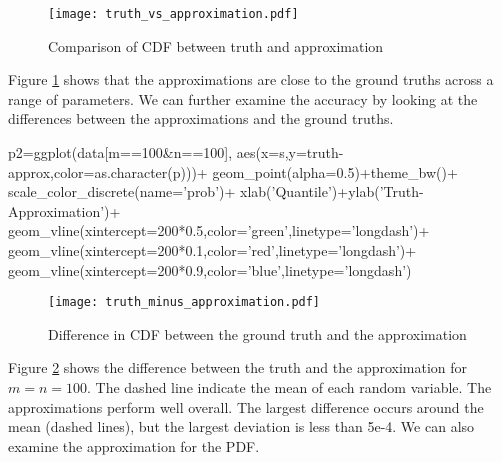 
\begin{figure}[ht]
\texttt{[image: truth\_vs\_approximation.pdf]}
\caption{Comparison of CDF between truth and approximation}
\label{fig:1}
\end{figure}

Figure \ref{fig:1} shows that the approximations are close to the ground truths across a range of parameters. We can further examine the accuracy by looking at the differences between the approximations and the ground truths. 

\begin{example}
p2=ggplot(data[m==100&n==100],
	aes(x=s,y=truth-approx,color=as.character(p)))+
	geom_point(alpha=0.5)+theme_bw()+
	scale_color_discrete(name='prob')+
	xlab('Quantile')+ylab('Truth-Approximation')+
	geom_vline(xintercept=200*0.5,color='green',linetype='longdash')+
	geom_vline(xintercept=200*0.1,color='red',linetype='longdash')+
	geom_vline(xintercept=200*0.9,color='blue',linetype='longdash')
\end{example}

\begin{figure}[ht]
\texttt{[image: truth\_minus\_approximation.pdf]}
\caption{Difference in CDF between the ground truth and the approximation}
\label{fig:2}
\end{figure}


Figure \ref{fig:2} shows the difference between the truth and the approximation for $m=n=100$. The dashed line indicate the mean of each random variable. The approximations perform well overall. The largest difference occurs around the mean (dashed lines), but the largest deviation is less than 5e-4. We can also examine the approximation for the PDF. 

